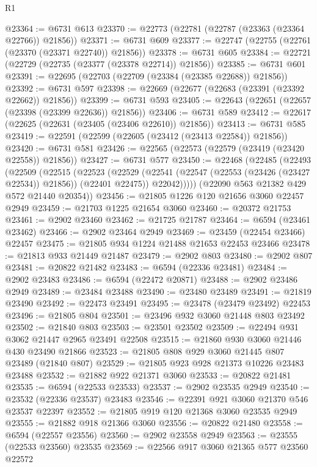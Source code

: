 \begin{lexlean}{R1}
\begin{coremodule}
@23364 := @6731 @613
@23370 := @22773 (@22781 (@22787 (@23363 (@23364 @22766)) @21856))
@23371 := @6731 @609
@23377 := @22747 (@22755 (@22761 (@23370 (@23371 @22740)) @21856))
@23378 := @6731 @605
@23384 := @22721 (@22729 (@22735 (@23377 (@23378 @22714)) @21856))
@23385 := @6731 @601
@23391 := @22695 (@22703 (@22709 (@23384 (@23385 @22688)) @21856))
@23392 := @6731 @597
@23398 := @22669 (@22677 (@22683 (@23391 (@23392 @22662)) @21856))
@23399 := @6731 @593
@23405 := @22643 (@22651 (@22657 (@23398 (@23399 @22636)) @21856))
@23406 := @6731 @589
@23412 := @22617 (@22625 (@22631 (@23405 (@23406 @22610)) @21856))
@23413 := @6731 @585
@23419 := @22591 (@22599 (@22605 (@23412 (@23413 @22584)) @21856))
@23420 := @6731 @581
@23426 := @22565 (@22573 (@22579 (@23419 (@23420 @22558)) @21856))
@23427 := @6731 @577
@23450 := @22468
    (@22485
      (@22493
        (@22509
          (@22515
            (@22523
              (@22529
                (@22541 (@22547 (@22553 (@23426 (@23427 @22534)) @21856)) (@22401 @22475))
                @22042)))))
      (@22090 @563 @21382 @429 @572 @21440 @20354))
@23456 := @21805 @1226 @120 @21656 @3060 @22457 @2949
@23459 := @21703 @1225 @21654 @3060
@23460 := @20372 @21753
@23461 := @2902 @23460
@23462 := @21725 @21787
@23464 := @6594 (@23461 @23462)
@23466 := @2902 @23464 @2949
@23469 := @23459 (@22454 @23466) @22457
@23475 := @21805 @934 @1224 @21488 @21653 @22453 @23466
@23478 := @21813 @933 @21449 @21487
@23479 := @2902 @803
@23480 := @2902 @807
@23481 := @20822 @21482
@23483 := @6594 (@22336 @23481)
@23484 := @2902 @23483
@23486 := @6594 (@22472 @20871)
@23488 := @2902 @23486 @2949
@23489 := @23484 @23488
@23490 := @23480 @23489
@23491 := @21819 @23490
@23492 := @22473 @23491
@23495 := @23478 (@23479 @23492) @22453
@23496 := @21805 @804
@23501 := @23496 @932 @3060 @21448 @803 @23492
@23502 := @21840 @803
@23503 := @23501 @23502
@23509 := @22494 @931 @3062 @21447 @2965 @23491 @22508
@23515 := @21860 @930 @3060 @21446 @430 @23490 @21866
@23523 := @21805 @808 @929 @3060 @21445 @807 @23489 (@21840 @807)
@23529 := @21805 @923 @928 @21373 @10226 @23483 @23488
@23532 := @21882 @922 @21371 @3060
@23533 := @20822 @21481
@23535 := @6594 (@22533 @23533)
@23537 := @2902 @23535 @2949
@23540 := @23532 (@22336 @23537) @23483
@23546 := @22391 @921 @3060 @21370 @546 @23537 @22397
@23552 := @21805 @919 @120 @21368 @3060 @23535 @2949
@23555 := @21882 @918 @21366 @3060
@23556 := @20822 @21480
@23558 := @6594 (@22557 @23556)
@23560 := @2902 @23558 @2949
@23563 := @23555 (@22533 @23560) @23535
@23569 := @22566 @917 @3060 @21365 @577 @23560 @22572

\end{coremodule}
\end{lexlean}
